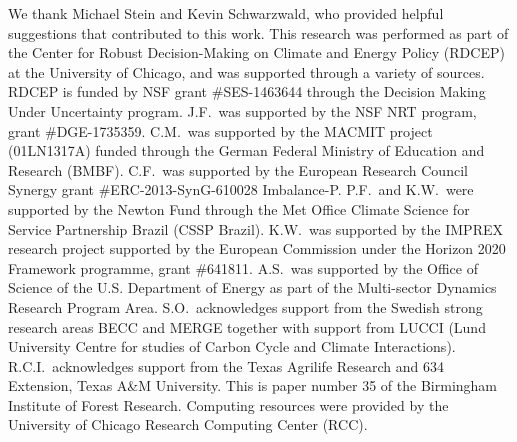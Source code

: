 \documentclass[esd, manuscript]{copernicus} %
\begin{document}


\begin{acknowledgements}
We thank Michael Stein and Kevin Schwarzwald, who provided helpful suggestions that contributed to this work. This research was performed as part of the Center for Robust Decision-Making on Climate and Energy Policy (RDCEP) at the University of Chicago, and was supported through a variety of sources. RDCEP is funded by NSF grant \#SES-1463644 through the Decision Making Under Uncertainty program. J.F.\ was supported by the NSF NRT program, grant \#DGE-1735359. C.M.\ was supported by the MACMIT project (01LN1317A) funded through the German Federal Ministry of Education and Research (BMBF). C.F.\ was supported by the European Research Council Synergy grant \#ERC-2013-SynG-610028 Imbalance-P. P.F.\ and K.W.\ were supported  by the Newton Fund through the Met Office Climate Science for Service Partnership Brazil (CSSP Brazil). K.W.\ was supported by the IMPREX research project supported by the European Commission under the Horizon 2020 Framework programme, grant \#641811. A.S.\ was supported by the Office of Science of the U.S. Department of Energy as part of the Multi-sector Dynamics Research Program Area. S.O.\ acknowledges support from the Swedish strong research areas BECC and MERGE together with support from LUCCI (Lund University Centre for studies of Carbon Cycle and Climate Interactions). R.C.I.\ acknowledges support from the Texas Agrilife Research and 634 Extension, Texas A&M University. This is paper number 35 of the Birmingham Institute of Forest Research. Computing resources were provided by the University of Chicago Research Computing Center (RCC).
\end{acknowledgements}



\end{document}

